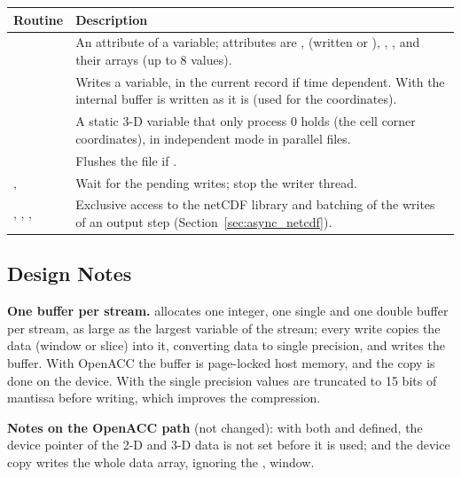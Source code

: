 \begin{longtable}{L{5.2cm} L{8.8cm}}
  \toprule
  \textbf{Routine} & \textbf{Description} \\
  \midrule
  \endhead
  \bottomrule
  \endfoot
   &
    An attribute of a variable; attributes are
    ,  (written  or
    ), , ,  and their
    arrays (up to 8 values). \\
   &
    Writes a variable, in the current record if time dependent. With
     the internal buffer is written as it is (used for
    the coordinates). \\
   &
    A static 3-D  variable that only process 0 holds (the
    cell corner coordinates), in independent mode in parallel files. \\
   & Flushes the file if . \\
  ,  &
    Wait for the pending writes; stop the writer thread. \\
  , ,
  ,  &
    Exclusive access to the netCDF library and batching of the writes of
    an output step (Section~\ref{sec:async_netcdf}). \\
\end{longtable}

\subsection{Design Notes}

\textbf{One buffer per stream.}  allocates one
integer, one single and one double buffer per stream, as large as the
largest variable of the stream; every write copies the data (window or
slice) into it, converting  data to single precision, and
writes the buffer. With OpenACC the buffer is page-locked host memory, and
the copy is done on the device. With  the single precision
values are truncated to 15 bits of mantissa before writing, which improves
the compression.

\textbf{Notes on the OpenACC path} (not changed): with both
 and  defined, the device pointer of the
 2-D and 3-D data is not set before it is used; and the
device copy writes the whole data array, ignoring the
,  window.


